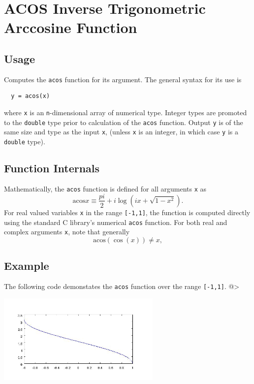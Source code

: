 \section{ACOS Inverse Trigonometric Arccosine Function}

\subsection{Usage}

Computes the \verb|acos| function for its argument.  The general
syntax for its use is
\begin{verbatim}
  y = acos(x)
\end{verbatim}
where \verb|x| is an \verb|n|-dimensional array of numerical type.
Integer types are promoted to the \verb|double| type prior to
calculation of the \verb|acos| function.  Output \verb|y| is of the
same size and type as the input \verb|x|, (unless \verb|x| is an
integer, in which case \verb|y| is a \verb|double| type).  
\subsection{Function Internals}

Mathematically, the \verb|acos| function is defined for all 
arguments \verb|x| as
\[
 \mathrm{acos} x \equiv \frac{pi}{2} + i \log \left(i x + 
  \sqrt{1-x^2}\right).
\]
For real valued variables \verb|x| in the range \verb|[-1,1]|, the function is
computed directly using the standard C library's numerical \verb|acos|
function. For both real and complex arguments \verb|x|, note that generally
\[
  \mathrm{acos}(\cos(x)) \neq x,
\]
\subsection{Example}

The following code demonstates the \verb|acos| function over the range 
\verb|[-1,1]|.
@>


\centerline{\includegraphics[width=8cm]{acosplot}}

